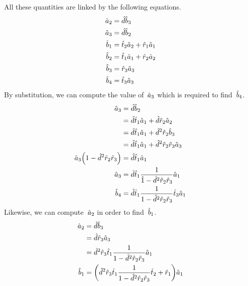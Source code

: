 All these quantities are linked by the following equations.
\begin{subequations}
    \begin{align}
    \hat{a}_2 &= \hat{d} \hat{b}_3                       \label{eq:cavity_rel_a2} \\
    \hat{a}_3 &= \hat{d} \hat{b}_2                       \label{eq:cavity_rel_a3} \\
    \hat{b}_1 &= \hat{t}_2 \hat{a}_2 + \hat{r}_1 \hat{a}_1 \label{eq:cavity_rel_b1} \\
    \hat{b}_2 &= \hat{t}_1 \hat{a}_1 + \hat{r}_2 \hat{a}_2 \label{eq:cavity_rel_b2} \\
    \hat{b}_3 &= \hat{r}_3 \hat{a}_3                     \label{eq:cavity_rel_b3} \\
    \hat{b}_4 &= \hat{t}_3 \hat{a}_3                     \label{eq:cavity_rel_b4}
    \end{align}
\end{subequations}
By substitution, we can compute the value of~$\hat{a}_3$ which is required to find~$\hat{b}_4$.
\begin{align}
    \cp{a}_3
    &= \cp{d} \cp{b}_2                                                 \notag \\
    &= \cp{d} \cp{t}_1 \cp{a}_1 + \cp{d}   \cp{r}_2 \cp{a}_2           \notag \\
    &= \cp{d} \cp{t}_1 \cp{a}_1 + \cp{d}^2 \cp{r}_2 \cp{b}_3           \notag \\
    &= \cp{d} \cp{t}_1 \cp{a}_1 + \cp{d}^2 \cp{r}_2 \cp{r}_3 \cp{a}_3  \notag
    \\
    \cp{a}_3 \left(1 - \cp{d}^2 \cp{r}_2 \cp{r}_3 \right)
    &=
    \cp{d} \cp{t}_1 \cp{a}_1
    \notag
    \\
    \cp{a}_3
    &=
    \cp{d} \cp{t}_1 \frac{1}{\cp{1} - \cp{d}^2 \cp{r}_2 \cp{r}_3} \cp{a}_1
    \notag
    \\
    \cp{b}_4
    &=
    \cp{d} \cp{t}_1 \frac{1}{1 - \cp{d}^2 \cp{r}_2 \cp{r}_3} \cp{t}_3 \cp{a}_1
    \label{eq:cavity_b4_a1}
\end{align}
Likewise, we can compute~$\hat{a}_2$ in order to find~$\hat{b}_1$.
\begin{align}
    \cp{a}_2
    &=
    \cp{d} \cp{b}_3                                     
    \notag
    \\
    &=
    \cp{d} \cp{r}_3 \cp{a}_3
    \notag
    \\
    &=
    \cp{d}^2 \cp{r}_3 \cp{t}_1 \frac{1}{1 - \cp{d}^2 \cp{r}_2 \cp{r}_3} \cp{a}_1
    \notag
    \\
    \cp{b}_1
    &=
    \left(
        \cp{d}^2 \cp{r}_3 \cp{t}_1
        \frac{1}{1 - \cp{d}^2 \cp{r}_2 \cp{r}_3} \cp{t}_2 + \cp{r}_1
    \right)
    \cp{a}_1
    \label{eq:cavity_b1_a1}
\end{align}
